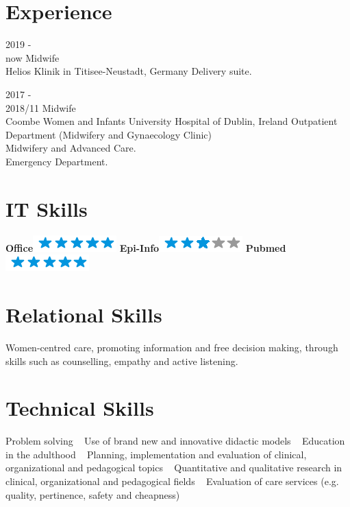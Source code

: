 \documentclass[11pt]{friggeri-cv}
\begin{document}
\section{Experience}
\begin{entrylist}
  \entry
    {2019 - \\now}
    {Midwife}
    {\\Helios Klinik in Titisee-Neustadt, Germany}
    {Delivery suite.}
  
  \entry
    {2017 - \\2018/11}
    {Midwife}
    {\\Coombe Women and Infants University Hospital of Dublin, Ireland}
    {Outpatient Department (Midwifery and Gynaecology Clinic)\\
     Midwifery and Advanced Care.\\
     Emergency Department.}
\end{entrylist}
\newpage

\begin{aside}
  \section{IT Skills}
  \textbf{Office}\includegraphics[scale=0.40]{img/5stars.png}
  \textbf{Epi-Info}\includegraphics[scale=0.40]{img/3stars.png}
  \textbf{Pubmed}\includegraphics[scale=0.40]{img/5stars.png}
  ~
  \section{Relational Skills}\footnotesize{
  Women-centred care, promoting information and free decision making, through 
  skills such as counselling, empathy and active listening}.
  ~
  \section{Technical Skills}\footnotesize{
  Problem solving
  ~
  Use of brand new and innovative didactic models
  ~
  Education in the adulthood
  ~
  Planning, implementation and evaluation of clinical, organizational and 
  pedagogical topics
  ~
  Quantitative and qualitative research in clinical, organizational and 
  pedagogical fields
  ~
  Evaluation of care services (e.g. quality, pertinence, safety and cheapness)}
\end{aside}
\end{document}

